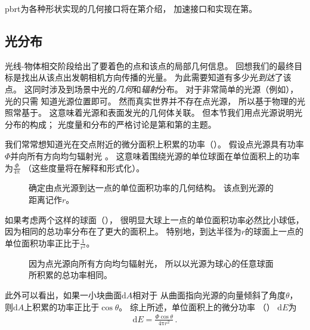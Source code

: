 pbrt为各种形状实现的几何接口将在第介绍，
加速接口和实现在第。

\subsection{光分布}\label{sub:光分布}

光线-物体相交阶段给出了要着色的点和该点的局部几何信息。
回想我们的最终目标是找出从该点出发朝相机方向传播的光量。
为此需要知道有多少光\emph{到达}了该点。
这同时涉及到场景中光的\emph{几何}和\emph{辐射}分布。
对于非常简单的光源（例如），
光的只需
知道光源位置即可。
然而真实世界并不存在点光源，
所以基于物理的光照常基于。
这意味着光源和表面发光的几何体关联。
但本节我们用点光源说明光分布的构成；
光度量和分布的严格讨论是第和第的主题。

我们常常想知道光在交点附近的微分面积上积累的功率（）。
假设点光源具有功率
$\varPhi$并向所有方向均匀辐射光
。
这意味着围绕光源的单位球面在单位面积上的功率
为$\displaystyle\frac{\varPhi}{4\mathrm{\pi}}$
（这些度量将在解释和形式化）。
\begin{figure}[htbp]
      \centering
      \caption{确定由点光源到达一点的单位面积功率的几何结构。
            该点到光源的距离记作$r$。}\label{fig:1.3}
\end{figure}

如果考虑两个这样的球面（），
很明显大球上一点的单位面积功率必然比小球低，
因为相同的总功率分布在了更大的面积上。
特别地，到达半径为$r$的球面上一点的单位面积功率正比于$\displaystyle\frac{1}{r^2}$。
\begin{figure}[htbp]
      \centering
      \caption{因为点光源向所有方向均匀辐射光，
            所以以光源为球心的任意球面所积累的总功率相同。}
      \label{fig:1.4}
\end{figure}

此外可以看出，如果一小块曲面$\mathrm{d}A$相对于
从曲面指向光源的向量倾斜了角度$\theta$，
则$\mathrm{d}A$上积累的功率正比于$\cos{\theta}$。
综上所述，单位面积上的微分功率
（）
$\mathrm{d}E$为
\begin{align*}
      \mathrm{d}E=\frac{\varPhi\cos{\theta}}{4\mathrm{\pi}r^2}\,.
\end{align*}

